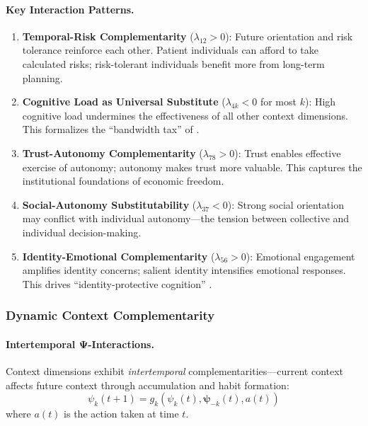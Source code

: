 \paragraph{Key Interaction Patterns.}

\begin{enumerate}
    \item \textbf{Temporal-Risk Complementarity} ($\lambda_{12} > 0$): Future orientation 
    and risk tolerance reinforce each other. Patient individuals can afford to take 
    calculated risks; risk-tolerant individuals benefit more from long-term planning.
    
    \item \textbf{Cognitive Load as Universal Substitute} ($\lambda_{4k} < 0$ for most $k$): 
    High cognitive load undermines the effectiveness of all other context dimensions. 
    This formalizes the ``bandwidth tax'' of \citet{mullainathan2013scarcity}.
    
    \item \textbf{Trust-Autonomy Complementarity} ($\lambda_{78} > 0$): Trust enables 
    effective exercise of autonomy; autonomy makes trust more valuable. This captures 
    the institutional foundations of economic freedom.
    
    \item \textbf{Social-Autonomy Substitutability} ($\lambda_{37} < 0$): Strong social 
    orientation may conflict with individual autonomy---the tension between collective 
    and individual decision-making.
    
    \item \textbf{Identity-Emotional Complementarity} ($\lambda_{56} > 0$): Emotional 
    engagement amplifies identity concerns; salient identity intensifies emotional 
    responses. This drives ``identity-protective cognition'' \citep{kahan2017cultural}.
\end{enumerate}

\subsubsection{Dynamic Context Complementarity}

\paragraph{Intertemporal Ψ-Interactions.}

Context dimensions exhibit \emph{intertemporal} complementarities---current context 
affects future context through accumulation and habit formation:
\begin{equation}
\psi_k(t+1) = g_k(\psi_k(t), \boldsymbol{\psi}_{-k}(t), a(t))
\end{equation}
where $a(t)$ is the action taken at time $t$.

